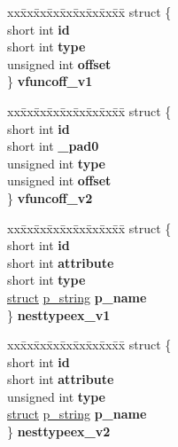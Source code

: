 \begin{DoxyCompactItemize}
\begin{tabbing}
\end{tabbing}\item 
\mbox{\label{unioncodeview__fieldtype_a076531ee599bc8242235d16d1e89cacc}} 
\begin{tabbing}
xx\=xx\=xx\=xx\=xx\=xx\=xx\=xx\=xx\=\kill
struct \{\\
\>short int {\bfseries id}\\
\>short int {\bfseries type}\\
\>unsigned int {\bfseries offset}\\
\} {\bfseries vfuncoff\_v1}\\

\end{tabbing}\item 
\mbox{\label{unioncodeview__fieldtype_a45486ddd1bb3bbabd07bff8861c1d761}} 
\begin{tabbing}
xx\=xx\=xx\=xx\=xx\=xx\=xx\=xx\=xx\=\kill
struct \{\\
\>short int {\bfseries id}\\
\>short int {\bfseries \_pad0}\\
\>unsigned int {\bfseries type}\\
\>unsigned int {\bfseries offset}\\
\} {\bfseries vfuncoff\_v2}\\

\end{tabbing}\item 
\mbox{\label{unioncodeview__fieldtype_a6e3ffcececb25812e01758aa76d0bb63}} 
\begin{tabbing}
xx\=xx\=xx\=xx\=xx\=xx\=xx\=xx\=xx\=\kill
struct \{\\
\>short int {\bfseries id}\\
\>short int {\bfseries attribute}\\
\>short int {\bfseries type}\\
\>\hyperlink{interfacestruct}{struct} \hyperlink{structp__string}{p\_string} {\bfseries p\_name}\\
\} {\bfseries nesttypeex\_v1}\\

\end{tabbing}\item 
\mbox{\label{unioncodeview__fieldtype_ae6bf109a8c988a3a16fea3855fea119d}} 
\begin{tabbing}
xx\=xx\=xx\=xx\=xx\=xx\=xx\=xx\=xx\=\kill
struct \{\\
\>short int {\bfseries id}\\
\>short int {\bfseries attribute}\\
\>unsigned int {\bfseries type}\\
\>\hyperlink{interfacestruct}{struct} \hyperlink{structp__string}{p\_string} {\bfseries p\_name}\\
\} {\bfseries nesttypeex\_v2}\\


\end{tabbing}
\end{DoxyCompactItemize}

